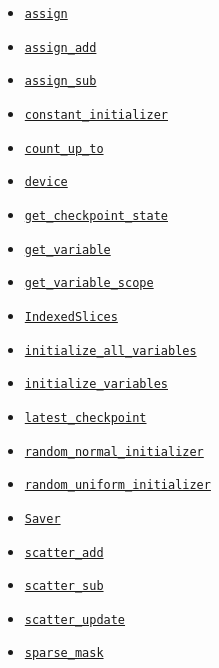 \begin{itemize}
\item
  \href{../../api_docs/python/state_ops.md\#assign}{\texttt{assign}}
\item
  \href{../../api_docs/python/state_ops.md\#assign_add}{\texttt{assign\_add}}
\item
  \href{../../api_docs/python/state_ops.md\#assign_sub}{\texttt{assign\_sub}}
\item
  \href{../../api_docs/python/state_ops.md\#constant_initializer}{\texttt{constant\_initializer}}
\item
  \href{../../api_docs/python/state_ops.md\#count_up_to}{\texttt{count\_up\_to}}
\item
  \href{../../api_docs/python/state_ops.md\#device}{\texttt{device}}
\item
  \href{../../api_docs/python/state_ops.md\#get_checkpoint_state}{\texttt{get\_checkpoint\_state}}
\item
  \href{../../api_docs/python/state_ops.md\#get_variable}{\texttt{get\_variable}}
\item
  \href{../../api_docs/python/state_ops.md\#get_variable_scope}{\texttt{get\_variable\_scope}}
\item
  \href{../../api_docs/python/state_ops.md\#IndexedSlices}{\texttt{IndexedSlices}}
\item
  \href{../../api_docs/python/state_ops.md\#initialize_all_variables}{\texttt{initialize\_all\_variables}}
\item
  \href{../../api_docs/python/state_ops.md\#initialize_variables}{\texttt{initialize\_variables}}
\item
  \href{../../api_docs/python/state_ops.md\#latest_checkpoint}{\texttt{latest\_checkpoint}}
\item
  \href{../../api_docs/python/state_ops.md\#random_normal_initializer}{\texttt{random\_normal\_initializer}}
\item
  \href{../../api_docs/python/state_ops.md\#random_uniform_initializer}{\texttt{random\_uniform\_initializer}}
\item
  \href{../../api_docs/python/state_ops.md\#Saver}{\texttt{Saver}}
\item
  \href{../../api_docs/python/state_ops.md\#scatter_add}{\texttt{scatter\_add}}
\item
  \href{../../api_docs/python/state_ops.md\#scatter_sub}{\texttt{scatter\_sub}}
\item
  \href{../../api_docs/python/state_ops.md\#scatter_update}{\texttt{scatter\_update}}
\item
  \href{../../api_docs/python/state_ops.md\#sparse_mask}{\texttt{sparse\_mask}}

\end{itemize}
